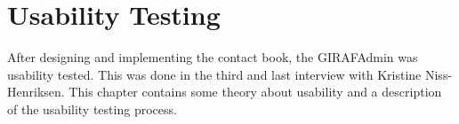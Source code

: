 \chapter{Usability Testing}
After designing and implementing the contact book, the GIRAFAdmin was usability tested. This was done in the third and last interview with Kristine Niss-Henriksen.
This chapter contains some theory about usability and a description of the usability testing process.

  